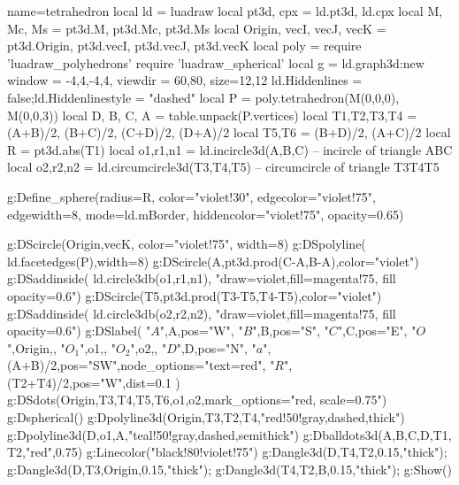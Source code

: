 \documentclass{standalone}
\begin{document}
\begin{luadraw}{name=tetrahedron}
local ld = luadraw
local pt3d, cpx = ld.pt3d, ld.cpx
local M, Mc, Ms = pt3d.M, pt3d.Mc, pt3d.Ms
local Origin, vecI, vecJ, vecK = pt3d.Origin, pt3d.vecI, pt3d.vecJ, pt3d.vecK
local poly = require 'luadraw_polyhedrons'
require 'luadraw_spherical'
local g = ld.graph3d:new{ window = {-4,4,-4,4}, viewdir = {60,80}, size={12,12} }
ld.Hiddenlines = false;ld.Hiddenlinestyle = "dashed"
local P = poly.tetrahedron(M(0,0,0), M(0,0,3))
local D, B, C, A = table.unpack(P.vertices)
local T1,T2,T3,T4 = (A+B)/2, (B+C)/2, (C+D)/2, (D+A)/2
local T5,T6 = (B+D)/2, (A+C)/2
local R = pt3d.abs(T1)
local o1,r1,n1 = ld.incircle3d(A,B,C) -- incircle of triangle ABC
local o2,r2,n2 = ld.circumcircle3d(T3,T4,T5) -- circumcircle of triangle T3T4T5

g:Define_sphere({radius=R, color="violet!30", edgecolor="violet!75", edgewidth=8, 
    mode=ld.mBorder, hiddencolor="violet!75", opacity=0.65})

g:DScircle({Origin,vecK}, {color="violet!75", width=8})
g:DSpolyline( ld.facetedges(P),{width=8})
g:DScircle({A,pt3d.prod(C-A,B-A)},{color="violet"})
g:DSaddinside( ld.circle3db(o1,r1,n1), "draw=violet,fill=magenta!75, fill opacity=0.6")
g:DScircle({T5,pt3d.prod(T3-T5,T4-T5)},{color="violet"})
g:DSaddinside( ld.circle3db(o2,r2,n2), "draw=violet,fill=magenta!75, fill opacity=0.6")
g:DSlabel(
    "$A$",A,{pos="W"},
    "$B$",B,{pos="S"},
    "$C$",C,{pos="E"},
    "$O$",Origin,{},
    "$O_1$",o1,{},
    "$O_2$",o2,{},
    "$D$",D,{pos="N"},
    "$a$",(A+B)/2,{pos="SW",node_options="text=red"},
    "$R$",(T2+T4)/2,{pos="W",dist=0.1}
)
g:DSdots({Origin,T3,T4,T5,T6,o1,o2},{mark_options="red, scale=0.75"})
g:Dspherical()
g:Dpolyline3d({{Origin,T3},{T2,T4}},"red!50!gray,dashed,thick")
g:Dpolyline3d({D,o1,A},"teal!50!gray,dashed,semithick")
g:Dballdots3d({A,B,C,D,T1, T2},"red",0.75)
g:Linecolor("black!80!violet!75")
g:Dangle3d(D,T4,T2,0.15,"thick"); g:Dangle3d(D,T3,Origin,0.15,"thick"); g:Dangle3d(T4,T2,B,0.15,"thick");
g:Show()
\end{luadraw}
\end{document}
